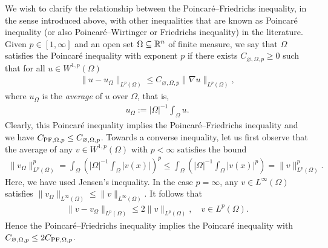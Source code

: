 \documentclass[a4paper]{amsart}
\begin{document}
We wish to clarify the relationship between the Poincar\'e--Friedrichs inequality, in the sense introduced above, with other inequalities that are known as Poincar\'e inequality (or also Poincar\'e--Wirtinger or Friedrichs inequality) in the literature. Given $p \in [1,\infty]$ and an open set $\Omega \subseteq {\mathbb R}^{n}$ of finite measure, 
we say that $\Omega$ satisfies the Poincar\'e inequality with exponent $p$ 
if there exists $C_{{\varnothing},\Omega,p} \geq 0$ such that 
for all $u \in W^{1,p}(\Omega)$
\begin{align}
    \| u - u_{\Omega} \|_{L^{p}(\Omega)}
    \leq 
    C_{\varnothing,\Omega,p} 
    \| \nabla u \|_{L^{p}(\Omega)}
    ,
\end{align}
where $u_{\Omega}$ is the \emph{average} of $u$ over $\Omega$, that is,
\begin{align*}
    u_{\Omega} := |\Omega|^{-1} \int_{\Omega} u.
\end{align*}
Clearly, this Poincar\'e inequality implies the Poincar\'e--Friedrichs inequality and we have $C_{{\rm{PF}},\Omega,p} \leq C_{\varnothing,\Omega,p}$. 
Towards a converse inequality, 
let us first observe that the average of any $v \in W^{1,p}(\Omega)$ with $p < \infty$ satisfies the bound 
\begin{align*}
    \| v_\Omega \|_{L^{p}(\Omega)}^{p}
    = 
    \int_{\Omega} \left( |\Omega|^{-1} \int_{\Omega} |v(x)| \right)^{p}
    \leq 
    \int_{\Omega} \left( |\Omega|^{-1} \int_{\Omega} |v(x)|^{p} \right)
    = 
    \| v \|_{L^{p}(\Omega)}^{p}
    .
\end{align*}
Here, we have used Jensen's inequality. 
In the case $p = \infty$, any $v \in L^{\infty}(\Omega)$ satisfies $\| v_\Omega \|_{L^{\infty}(\Omega)} \leq \| v \|_{L^{\infty}(\Omega)}$. 
It follows that 
\begin{align*}
    \| v - v_\Omega \|_{L^{p}(\Omega)} 
    \leq
    2
    \| v \|_{L^{p}(\Omega)},
    \quad 
    v \in L^{p}(\Omega)
    .
\end{align*}
Hence the Poincar\'e--Friedrichs inequality implies the Poincar\'e inequality with $C_{\varnothing,\Omega,p} \leq 2 C_{{\rm PF},\Omega,p}$. 
\end{document}
